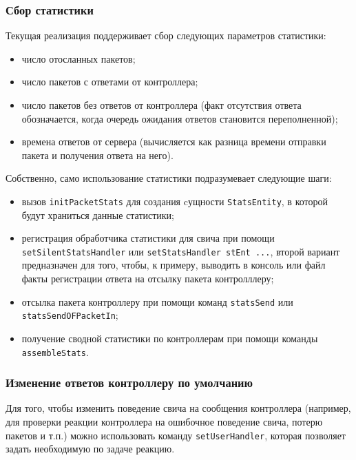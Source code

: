 \documentclass[9pt,a4paper]{article}
\begin{document}
\subsubsection{Сбор статистики}

Текущая реализация поддерживает сбор следующих параметров статистики:

\begin{itemize}
  \item число отосланных пакетов;
  \item число пакетов с ответами от контроллера;
  \item число пакетов без ответов от контроллера (факт отсутствия ответа обозначается,
    когда очередь ожидания ответов становится переполненной);
  \item времена ответов от сервера (вычисляется как разница времени отправки пакета
    и получения ответа на него).
\end{itemize}

Собственно, само использование статистики подразумевает следующие шаги:

\begin{itemize}
  \item вызов \lstinline!initPacketStats! для создания cущности \lstinline!StatsEntity!,
    в которой будут храниться данные статистики;
  \item регистрация обработчика статистики для свича при помощи 
    \lstinline!setSilentStatsHandler! или \lstinline!setStatsHandler stEnt ...!,
    второй вариант предназначен для того, чтобы, к примеру, выводить в консоль или
    файл факты регистрации ответа на отсылку пакета контролллеру;
  \item отсылка пакета контроллеру при помощи команд \lstinline!statsSend! или
    \lstinline!statsSendOFPacketIn!;
  \item получение сводной статистики по контроллерам при помощи команды
    \lstinline!assembleStats!.
\end{itemize}

\subsubsection{Изменение ответов контроллеру по умолчанию}

Для того, чтобы изменить поведение свича на сообщения контроллера (например, для
проверки реакции контроллера на ошибочное поведение свича, потерю пакетов и т.п.)
можно использовать команду \lstinline!setUserHandler!, которая позволяет задать
необходимую по задаче реакцию.
\end{document}
